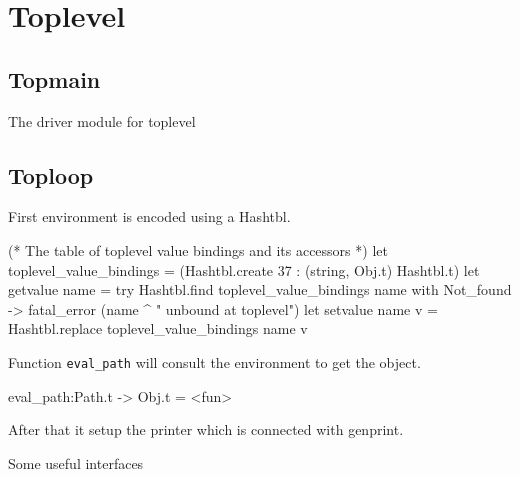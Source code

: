 

\section{Toplevel}

\subsection{Topmain}
The driver module for toplevel


\subsection{Toploop}
First environment is encoded using a Hashtbl.
\begin{ocamlcode}
(* The table of toplevel value bindings and its accessors *)
let toplevel_value_bindings =
  (Hashtbl.create 37 : (string, Obj.t) Hashtbl.t)
let getvalue name =
  try
    Hashtbl.find toplevel_value_bindings name
  with Not_found ->
    fatal_error (name ^ " unbound at toplevel")
let setvalue name v =
  Hashtbl.replace toplevel_value_bindings name v
\end{ocamlcode}

Function \verb|eval_path| will consult the environment to 
get the object.

\begin{ocamlcode}
eval_path:Path.t -> Obj.t = <fun>
\end{ocamlcode}
After that it setup the printer which is connected with genprint.

Some useful interfaces

